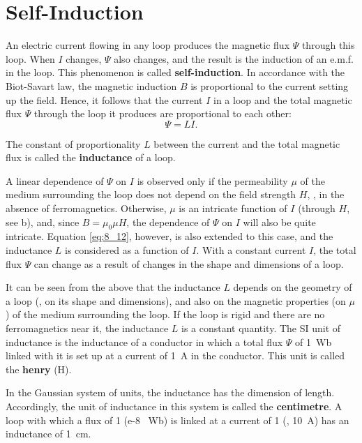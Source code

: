 \section{Self-Induction}\label{sec:8_5}

An electric current flowing in any loop produces the magnetic flux $\Psi$ through this loop.
When $I$ changes, $\Psi$ also changes, and the result
is the induction of an e.m.f. in the loop.
This phenomenon is called \textbf{self-induction}.
In accordance with the Biot-Savart law, the magnetic induction $B$ is proportional to the current setting up the field.
Hence, it follows that the current $I$ in a loop and the total magnetic flux $\Psi$ through the loop it produces are proportional to each other:
\begin{equation}\label{eq:8_12}
	\Psi = L I.
\end{equation}

\noindent
The constant of proportionality $L$ between the current and the total magnetic flux is called the \textbf{inductance} of a loop.

A linear dependence of $\Psi$ on $I$ is observed only if the permeability $\mu$ of the medium surrounding the loop does not depend on the field
strength $H$, \ie, in the absence of ferromagnetics.
Otherwise, $\mu$ is an intricate function of $I$ (through $H$, see b), and, since $B=\mu_0\mu H$, the dependence of $\Psi$ on $I$ will also be quite intricate.
Equation \eqref{eq:8_12}, however, is also extended to this case, and the inductance $L$ is considered as a function of $I$.
With a constant current $I$, the total flux $\Psi$ can change as a result of changes in the shape and dimensions of a loop.

It can be seen from the above that the inductance $L$ depends on the geometry of a loop (\ie, on its shape and dimensions), and also on the magnetic properties (on $\mu$) of the medium surrounding the loop.
If the loop is rigid and there are no ferromagnetics near it, the inductance $L$ is a constant quantity.
The SI unit of inductance is the inductance of a conductor in which a total flux $\Psi$ of \SI{1}{\weber} linked with it is set up at a current of \SI{1}{\ampere} in the conductor. This unit is called the \textbf{henry} (\si{\henry}).

In the Gaussian system of units, the inductance has the dimension of length.
Accordingly, the unit of inductance in this system is
called the \textbf{centimetre}.
A loop with which a flux of \SI{1}{\maxwell} (\SI{e-8
}{\weber}) is linked at a current of \SI{1}{} (\ie, \SI{10}{\ampere}) has an inductance of \SI{1}{\centi\metre}.

